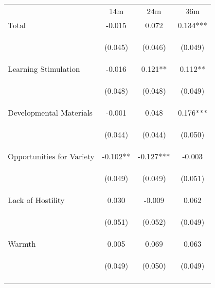 \begin{tabular}{lccc}
\hline \noalign{\smallskip} & 14m & 24m & 36m\\
\noalign{\smallskip}\hline \noalign{\smallskip}Total & -0.015 & 0.072 & 0.134***\\
 & \begin{footnotesize}(0.045)\end{footnotesize} & \begin{footnotesize}(0.046)\end{footnotesize} & \begin{footnotesize}(0.049)\end{footnotesize}\\
\noalign{\smallskip}Learning Stimulation & -0.016 & 0.121** & 0.112**\\
 & \begin{footnotesize}(0.048)\end{footnotesize} & \begin{footnotesize}(0.048)\end{footnotesize} & \begin{footnotesize}(0.049)\end{footnotesize}\\
\noalign{\smallskip}Developmental Materials & -0.001 & 0.048 & 0.176***\\
 & \begin{footnotesize}(0.044)\end{footnotesize} & \begin{footnotesize}(0.044)\end{footnotesize} & \begin{footnotesize}(0.050)\end{footnotesize}\\
\noalign{\smallskip}Opportunities for Variety & -0.102** & -0.127*** & -0.003\\
 & \begin{footnotesize}(0.049)\end{footnotesize} & \begin{footnotesize}(0.049)\end{footnotesize} & \begin{footnotesize}(0.051)\end{footnotesize}\\
\noalign{\smallskip}Lack of Hostility & 0.030 & -0.009 & 0.062\\
 & \begin{footnotesize}(0.051)\end{footnotesize} & \begin{footnotesize}(0.052)\end{footnotesize} & \begin{footnotesize}(0.049)\end{footnotesize}\\
\noalign{\smallskip}Warmth & 0.005 & 0.069 & 0.063\\
 & \begin{footnotesize}(0.049)\end{footnotesize} & \begin{footnotesize}(0.050)\end{footnotesize} & \begin{footnotesize}(0.049)\end{footnotesize}\\
\noalign{\smallskip}\hline\end{tabular}\\
